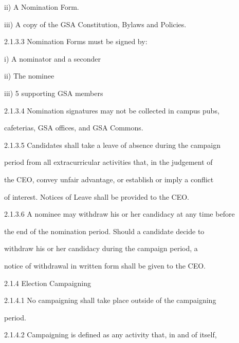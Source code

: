   

                   ii)      A Nomination Form.   

  

                   iii)     A copy of the GSA Constitution, Bylaws and Policies.   

  

2.1.3.3         Nomination Forms must be signed by:   

  

                   i)       A nominator and a seconder   

  

                   ii)       The nominee   

  

                   iii)      5 supporting GSA members   

  

2.1.3.4         Nomination  signatures  may  not  be  collected  in  campus  pubs,  

                cafeterias, GSA offices, and GSA Commons.   

  

2.1.3.5         Candidates  shall  take  a  leave  of  absence  during  the  campaign  

                period from all extracurricular activities that, in the judgement of  

                the CEO, convey unfair advantage, or establish or imply a conflict  

                of interest. Notices of Leave shall be provided to the CEO.   

  

2.1.3.6         A nominee may withdraw his or her candidacy at any time before  

                the  end  of  the  nomination  period.  Should  a  candidate  decide  to  

                withdraw  his  or  her  candidacy  during  the  campaign  period,  a  

                notice of withdrawal in written form shall be given to the CEO.   

  

2.1.4  Election Campaigning  

2.1.4.1         No  campaigning  shall  take  place  outside  of  the  campaigning  

                period.   

  

2.1.4.2         Campaigning  is  defined  as  any  activity  that,  in  and  of  itself,  


